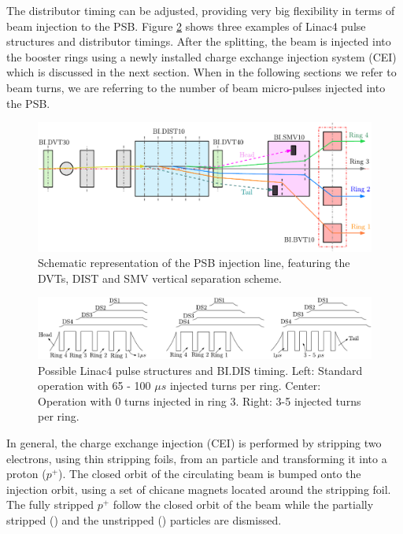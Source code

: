 The distributor timing can be adjusted, providing very big flexibility in terms of beam injection to the PSB. Figure \ref{fig:DistTiming} shows three examples of Linac4 pulse structures and distributor timings. After the splitting, the beam is injected into the booster rings using a newly installed charge exchange injection system (CEI) which is discussed in the next section. When in the following sections we refer to beam turns, we are referring to the number of beam micro-pulses injected into the PSB.  

\begin{figure}[h]
    \centering
    \includegraphics[width=1.0\columnwidth]{Figure_DistributorBeam/InjecLayout.pdf}
    \caption{Schematic representation of the PSB injection line, featuring the DVTs, DIST and SMV vertical separation scheme. }
    \label{fig:Injection}
\end{figure}

\begin{figure}[h]
    \centering
    \includegraphics[width=1.0\columnwidth]{Figure_DistTiming/DistTiming.pdf}
    \caption{Possible Linac4 pulse structures and BI.DIS timing. Left: Standard operation with 65 - 100 $\mu s$ injected turns per ring. Center: Operation with 0 turns injected in ring 3. Right: 3-5 injected turns per ring.  }
    \label{fig:DistTiming}
\end{figure}

In general, the charge exchange injection (CEI) is performed by stripping two electrons, using thin stripping foils,  from an \hm particle and transforming it into a proton ($p^{+}$).  The closed orbit of the circulating beam is bumped onto the injection orbit, using a set of chicane magnets located around the stripping foil. The fully stripped $p^{+}$ follow the closed orbit of the beam while the partially stripped (\hzz) and the unstripped (\hm) particles are dismissed. 

